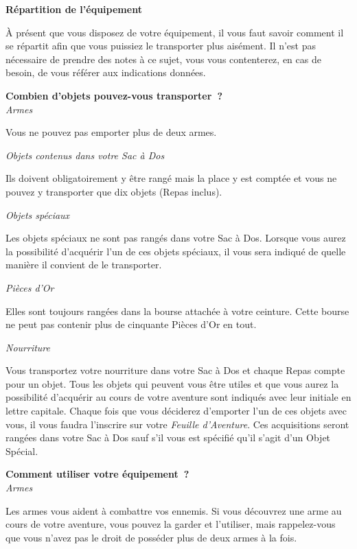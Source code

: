 \documentclass[10pt]{book}
\begin{document}
\begin{center}
  \textbf{Répartition de l'équipement}
\end{center}

À présent que vous disposez de votre équipement, il vous faut savoir comment il se
répartit afin que vous puissiez le transporter plus aisément. Il n'est pas nécessaire
de prendre des notes à ce sujet, vous vous contenterez, en cas de besoin, de vous référer
aux indications données.

\begin{center}
  \textbf{Combien d'objets pouvez-vous transporter~?}\\
  \textit{Armes}
\end{center}
Vous ne pouvez pas emporter plus de deux armes.

\begin{center}
  \textit{Objets contenus dans votre Sac à Dos}
\end{center}
Ils doivent obligatoirement y être rangé mais la place y est comptée et vous ne pouvez
y transporter que dix objets (Repas inclus).

\begin{center}
  \textit{Objets spéciaux}
\end{center}
Les objets spéciaux ne sont pas rangés dans votre Sac à Dos. Lorsque vous aurez
la possibilité d'acquérir l'un de ces objets spéciaux, il vous sera indiqué de
quelle manière il convient de le transporter.

\begin{center}
  \textit{Pièces d'Or}
\end{center}
Elles sont toujours rangées dans la bourse attachée à votre ceinture. Cette bourse
ne peut pas contenir plus de cinquante Pièces d'Or en tout.

\begin{center}
  \textit{Nourriture}
\end{center}
Vous transportez votre nourriture dans votre Sac à Dos et chaque Repas compte pour
un objet. Tous les objets qui peuvent vous être utiles et que vous aurez la possibilité
d'acquérir au cours de votre aventure sont indiqués avec leur initiale en lettre capitale.
Chaque fois que vous déciderez d'emporter l'un de ces objets avec vous, il vous
faudra l'inscrire sur votre \textit{Feuille d'Aventure}. Ces acquisitions seront
rangées dans votre Sac à Dos sauf s'il vous est spécifié qu'il s'agit d'un Objet Spécial.

\begin{center}
  \textbf{Comment utiliser votre équipement~?}\\
  \textit{Armes}
\end{center}
Les armes vous aident à combattre vos ennemis. Si vous découvrez une arme au cours
de votre aventure, vous pouvez la garder et l'utiliser, mais rappelez-vous que vous
n'avez pas le droit de posséder plus de deux armes à la fois.
\end{document}
